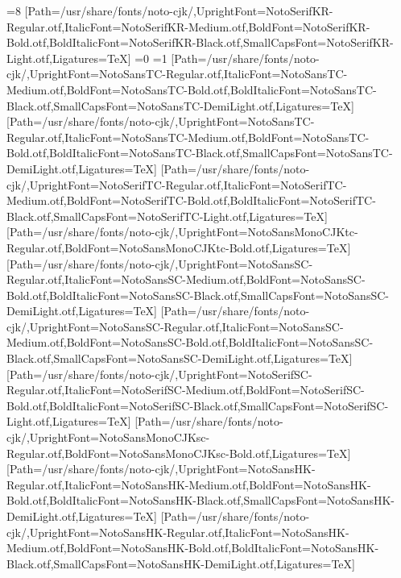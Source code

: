 \else\ifnum\value{CJKFonts}=8
[Path=/usr/share/fonts/noto-cjk/,UprightFont=NotoSerifKR-Regular.otf,ItalicFont=NotoSerifKR-Medium.otf,BoldFont=NotoSerifKR-Bold.otf,BoldItalicFont=NotoSerifKR-Black.otf,SmallCapsFont=NotoSerifKR-Light.otf,Ligatures=TeX]
\fi\fi\fi\fi\fi\fi\fi\fi\fi\fi\fi\fi\fi\fi
\ifnum\value{NotoCJKFamily}=0
\else\ifnum\value{NotoCJKFamily}=1
\newfontfamily{}[Path=/usr/share/fonts/noto-cjk/,UprightFont=NotoSansTC-Regular.otf,ItalicFont=NotoSansTC-Medium.otf,BoldFont=NotoSansTC-Bold.otf,BoldItalicFont=NotoSansTC-Black.otf,SmallCapsFont=NotoSansTC-DemiLight.otf,Ligatures=TeX]
\newfontfamily{}[Path=/usr/share/fonts/noto-cjk/,UprightFont=NotoSansTC-Regular.otf,ItalicFont=NotoSansTC-Medium.otf,BoldFont=NotoSansTC-Bold.otf,BoldItalicFont=NotoSansTC-Black.otf,SmallCapsFont=NotoSansTC-DemiLight.otf,Ligatures=TeX]
\newfontfamily{}[Path=/usr/share/fonts/noto-cjk/,UprightFont=NotoSerifTC-Regular.otf,ItalicFont=NotoSerifTC-Medium.otf,BoldFont=NotoSerifTC-Bold.otf,BoldItalicFont=NotoSerifTC-Black.otf,SmallCapsFont=NotoSerifTC-Light.otf,Ligatures=TeX]
\newfontfamily{}[Path=/usr/share/fonts/noto-cjk/,UprightFont=NotoSansMonoCJKtc-Regular.otf,BoldFont=NotoSansMonoCJKtc-Bold.otf,Ligatures=TeX]
\newfontfamily{}[Path=/usr/share/fonts/noto-cjk/,UprightFont=NotoSansSC-Regular.otf,ItalicFont=NotoSansSC-Medium.otf,BoldFont=NotoSansSC-Bold.otf,BoldItalicFont=NotoSansSC-Black.otf,SmallCapsFont=NotoSansSC-DemiLight.otf,Ligatures=TeX]
\newfontfamily{}[Path=/usr/share/fonts/noto-cjk/,UprightFont=NotoSansSC-Regular.otf,ItalicFont=NotoSansSC-Medium.otf,BoldFont=NotoSansSC-Bold.otf,BoldItalicFont=NotoSansSC-Black.otf,SmallCapsFont=NotoSansSC-DemiLight.otf,Ligatures=TeX]
\newfontfamily{}[Path=/usr/share/fonts/noto-cjk/,UprightFont=NotoSerifSC-Regular.otf,ItalicFont=NotoSerifSC-Medium.otf,BoldFont=NotoSerifSC-Bold.otf,BoldItalicFont=NotoSerifSC-Black.otf,SmallCapsFont=NotoSerifSC-Light.otf,Ligatures=TeX]
\newfontfamily{}[Path=/usr/share/fonts/noto-cjk/,UprightFont=NotoSansMonoCJKsc-Regular.otf,BoldFont=NotoSansMonoCJKsc-Bold.otf,Ligatures=TeX]
\newfontfamily{}[Path=/usr/share/fonts/noto-cjk/,UprightFont=NotoSansHK-Regular.otf,ItalicFont=NotoSansHK-Medium.otf,BoldFont=NotoSansHK-Bold.otf,BoldItalicFont=NotoSansHK-Black.otf,SmallCapsFont=NotoSansHK-DemiLight.otf,Ligatures=TeX]
\newfontfamily{}[Path=/usr/share/fonts/noto-cjk/,UprightFont=NotoSansHK-Regular.otf,ItalicFont=NotoSansHK-Medium.otf,BoldFont=NotoSansHK-Bold.otf,BoldItalicFont=NotoSansHK-Black.otf,SmallCapsFont=NotoSansHK-DemiLight.otf,Ligatures=TeX]
